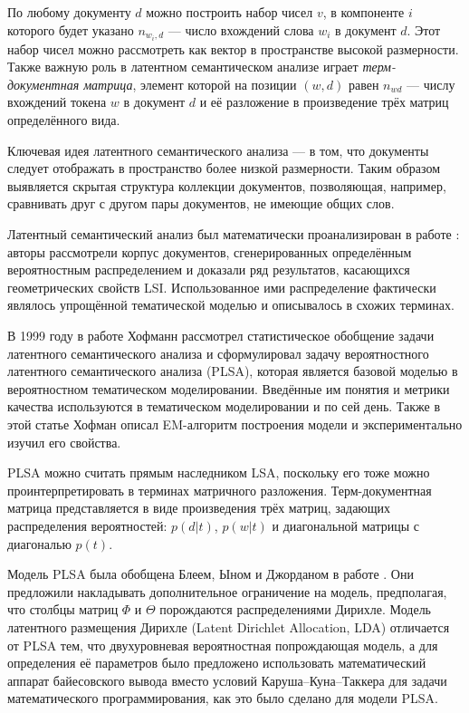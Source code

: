 По любому документу $d$ можно построить набор чисел $v$, в компоненте $i$ которого будет указано $n_{{w_i}, d}$ --- число вхождений слова $w_i$ в документ $d$. Этот набор чисел можно рассмотреть как вектор в пространстве высокой размерности. Также важную роль в латентном семантическом анализе играет \textit{терм-документная матрица}, элемент которой на позиции $(w, d)$ равен $n_{wd}$ --- числу вхождений токена $w$ в документ $d$ и её разложение в произведение трёх матриц определённого вида.

Ключевая идея латентного семантического анализа --- в том, что документы следует отображать в пространство более низкой размерности. Таким образом выявляется скрытая структура коллекции документов, позволяющая, например, сравнивать друг с другом пары документов, не имеющие общих слов.

Латентный семантический анализ был математически проанализирован в работе \cite{papadimitriou1998latent}: авторы рассмотрели корпус документов, сгенерированных определённым вероятностным распределением и доказали ряд результатов, касающихся геометрических свойств LSI. Использованное ими распределение фактически являлось упрощённой тематической моделью и описывалось в схожих терминах.

В 1999 году в работе \cite{hofmann1999probabilistic} Хофманн рассмотрел статистическое обобщение задачи латентного семантического анализа и сформулировал задачу вероятностного латентного семантического анализа (PLSA), которая является базовой моделью в вероятностном тематическом моделировании. 
Введённые им понятия и метрики качества используются в тематическом моделировании и по сей день. Также в этой статье Хофман описал EM-алгоритм построения модели и экспериментально изучил его свойства.

PLSA можно считать прямым наследником LSA, поскольку его тоже можно проинтерпретировать в терминах матричного разложения. Терм-документная матрица представляется в виде произведения трёх матриц, задающих распределения вероятностей: $p(d|t)$, $p(w|t)$ и диагональной матрицы с диагональю $p(t)$.

Модель PLSA была обобщена Блеем, Ыном и Джорданом в работе  \cite{blei2003latent}. Они предложили накладывать дополнительное ограничение на модель, предполагая, что столбцы матриц $\Phi$ и $\Theta$ порождаются распределениями Дирихле. Модель латентного размещения Дирихле (Latent Dirichlet Allocation, LDA) отличается от PLSA тем, что двухуровневая вероятностная попрождающая модель, а для определения её параметров было предложено использовать математический аппарат байесовского вывода вместо условий Каруша--Куна--Таккера для задачи математического программирования, как это было сделано для модели PLSA.


